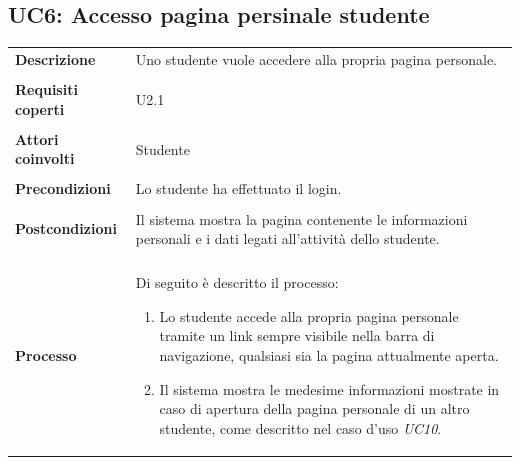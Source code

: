 \documentclass[10pt,a4paper]{article}
\begin{document}
	\subsection{UC6: Accesso pagina persinale studente}
	\begin{tabular}{lp{}}
		\textbf{Descrizione}&Uno studente vuole accedere alla propria pagina personale.\\
		\\
		\textbf{Requisiti coperti}&U2.1\\
		\\
		\textbf{Attori coinvolti}&Studente\\
		\\
		\textbf{Precondizioni}&Lo studente ha effettuato il login.\\
		\\
		\textbf{Postcondizioni}&Il sistema mostra la pagina contenente le informazioni personali e i dati legati all'attività dello studente.\\
		\\
		\textbf{Processo}&Di seguito è descritto il processo:
		\begin{enumerate}
			\item Lo studente accede alla propria pagina personale tramite un link sempre visibile nella barra di navigazione, qualsiasi sia la pagina attualmente aperta.
			\item Il sistema mostra le medesime informazioni mostrate in caso di apertura della pagina personale di un altro studente, come descritto nel caso d'uso \textit{UC10}.
		\end{enumerate}
	\end{tabular}
\end{document}
